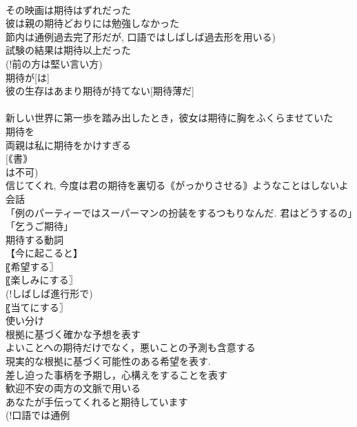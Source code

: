 \documentclass[8pt]{extreport}
\begin{document}
\begin{CJK}{UTF8}{min}
\\	その映画は期待はずれだった 
\\	彼は親の期待どおりには勉強しなかった 
\\	節内は通例過去完了形だが, 口語ではしばしば過去形を用いる) 
\\	試験の結果は期待以上だった 
\\	(!前の方は堅い言い方) 
\\	期待が[は] 
\\	彼の生存はあまり期待が持てない[期待薄だ] 
\\	[｟米｠ 
\\	私の期待ははずれた 
\\	そのことを知ると息子に対する期待が高まった 
\\	期待に 
\\	彼は我々の期待にこたえてくれた 
\\	私の期待に反して彼は失敗した 
\\	私たちは期待にわくわくした[胸を躍らせた] 
\\	新しい世界に第一歩を踏み出したとき，彼女は期待に胸をふくらませていた 
\\	期待を 
\\	両親は私に期待をかけすぎる 
\\	[｟書｠ 
\\	は不可) 
\\	信じてくれ, 今度は君の期待を裏切る｟がっかりさせる｠ようなことはしないよ 
\\	会話 
\\	「例のパーティーではスーパーマンの扮装をするつもりなんだ. 君はどうするの」「乞うご期待」 
\\	期待する動詞 
\\	【今に起こると】
\\	〖希望する〗
\\	〖楽しみにする〗
\\	(!しばしば進行形で) 
\\	〖当てにする〗
\\	使い分け 
\\	根拠に基づく確かな予想を表す
\\	よいことへの期待だけでなく，悪いことの予測も含意する
\\	現実的な根拠に基づく可能性のある希望を表す. 
\\	差し迫った事柄を予期し，心構えをすることを表す
\\	歓迎不安の両方の文脈で用いる
\\	あなたが手伝ってくれると期待しています 
\\	(!口語では通例 

\end{CJK}
\end{document}
